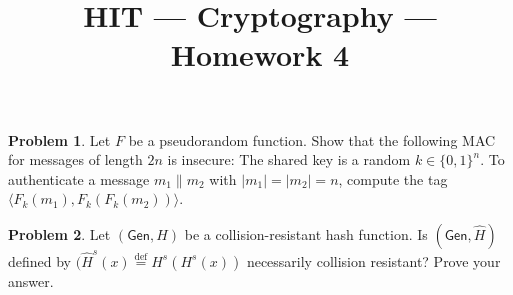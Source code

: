 \documentclass[11pt]{article}
\title{HIT --- Cryptography --- Homework 4}
\theoremstyle{definition}
\providecommand{\abs}[1]{\lvert#1\rvert}
\newtheorem{problem}{Problem}
\begin{document}
\maketitle

\begin{problem}
Let $F$ be a pseudorandom function. Show that the following MAC for messages of length $2n$ is insecure: The shared key is a random $k\in \{0,1\}^n$. To authenticate a message $m_1\| m_2$ with $\abs{m_1} =\abs{m_2} = n$, compute the tag $\langle F_k(m_1), F_k(F_k(m_2))\rangle$. 
\end{problem}

\begin{problem}
Let $(\mathsf{Gen},H)$ be a collision-resistant hash function. Is $(\mathsf{Gen},\hat{H})$ defined by $(\hat{H}^s(x) \overset{\text{def}}{=} H^s(H^s(x))$ necessarily collision resistant? Prove your answer. 
\end{problem}
\end{document}
